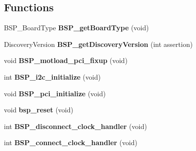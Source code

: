 \subsection*{Functions}
\begin{DoxyCompactItemize}
\item 
\mbox{\label{group__RTEMSBSPsPowerPCBeatnik_ga918401ca4b6068bb0c9a27f6959dc108}} 
B\+S\+P\+\_\+\+Board\+Type {\bfseries B\+S\+P\+\_\+get\+Board\+Type} (void)
\item 
\mbox{\label{group__RTEMSBSPsPowerPCBeatnik_gae0fc18e7440aa195934ec75ac4198b93}} 
Discovery\+Version {\bfseries B\+S\+P\+\_\+get\+Discovery\+Version} (int assertion)
\item 
\mbox{\label{group__RTEMSBSPsPowerPCBeatnik_ga8753dd0fb905f41f37c5d87c7a26c7e2}} 
void {\bfseries B\+S\+P\+\_\+motload\+\_\+pci\+\_\+fixup} (void)
\item 
\mbox{\label{group__RTEMSBSPsPowerPCBeatnik_gae987223f62f3fe1a0e5b03464e3e4b3e}} 
int {\bfseries B\+S\+P\+\_\+i2c\+\_\+initialize} (void)
\item 
\mbox{\label{group__RTEMSBSPsPowerPCBeatnik_ga137ef0d8aea9d767b0f7afd2134888fd}} 
void {\bfseries B\+S\+P\+\_\+pci\+\_\+initialize} (void)
\item 
\mbox{\label{group__RTEMSBSPsPowerPCBeatnik_gaee99733067120706ee7d3395ea225dfb}} 
void {\bfseries bsp\+\_\+reset} (void)
\item 
\mbox{\label{group__RTEMSBSPsPowerPCBeatnik_ga5b6f7a1b73b76ef80251fd770905d0c1}} 
int {\bfseries B\+S\+P\+\_\+disconnect\+\_\+clock\+\_\+handler} (void)
\item 
\mbox{\label{group__RTEMSBSPsPowerPCBeatnik_ga7e99fec6e3bd9986094a2de9cc0b110a}} 
int {\bfseries B\+S\+P\+\_\+connect\+\_\+clock\+\_\+handler} (void)
\item 
\mbox{\label{group__RTEMSBSPsPowerPCBeatnik_ga9365175934c534169a41c05950c05fcd}} 

\end{DoxyCompactItemize}
